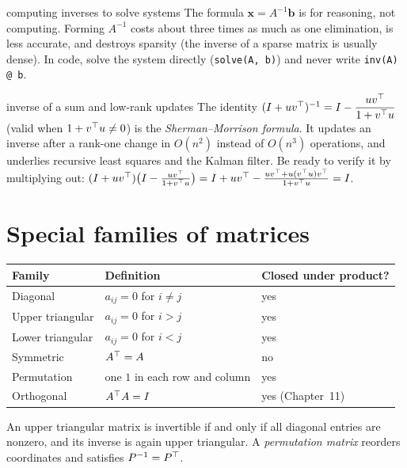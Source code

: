 \begin{pitfall}{computing inverses to solve systems}
The formula $\mathbf{x}=A^{-1}\mathbf{b}$ is for reasoning, not computing. Forming $A^{-1}$ costs about three times as much as one elimination, is less accurate, and destroys sparsity (the inverse of a sparse matrix is usually dense). In code, solve the system directly (\texttt{solve(A, b)}) and never write \texttt{inv(A) @ b}.
\end{pitfall}

\begin{interview}{inverse of a sum and low-rank updates}
The identity $(I+uv^{\top})^{-1}=I-\dfrac{uv^{\top}}{1+v^{\top} u}$ (valid when $1+v^{\top} u\ne0$) is the \emph{Sherman--Morrison formula}. It updates an inverse after a rank-one change in $O(n^2)$ instead of $O(n^3)$ operations, and underlies recursive least squares and the Kalman filter. Be ready to verify it by multiplying out: $(I+uv^{\top})\big(I-\frac{uv^{\top}}{1+v^{\top} u}\big)=I+uv^{\top}-\frac{uv^{\top}+u(v^{\top} u)v^{\top}}{1+v^{\top} u}=I$.
\end{interview}

\section{Special families of matrices}

\begin{center}
\begin{tabular}{lll}
\toprule
Family & Definition & Closed under product? \\
\midrule
Diagonal & $a_{ij}=0$ for $i\ne j$ & yes \\
Upper triangular & $a_{ij}=0$ for $i>j$ & yes \\
Lower triangular & $a_{ij}=0$ for $i<j$ & yes \\
Symmetric & $A^{\top}=A$ & no \\
Permutation & one $1$ in each row and column & yes \\
Orthogonal & $A^{\top} A=I$ & yes (Chapter~11) \\
\bottomrule
\end{tabular}
\end{center}

An upper triangular matrix is invertible if and only if all diagonal entries are nonzero, and its inverse is again upper triangular. A \emph{permutation matrix} reorders coordinates and satisfies $P^{-1}=P^{\top}$.

